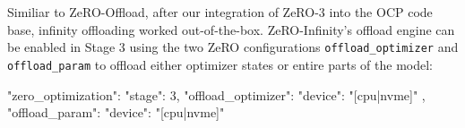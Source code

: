 Similiar to ZeRO-Offload, after our integration of ZeRO-3 into the OCP 
code base, infinity offloading worked out-of-the-box. ZeRO-Infinity's
offload engine can be enabled in Stage 3 using the two ZeRO configurations 
\texttt{offload\_optimizer} and \texttt{offload\_param} to offload 
either optimizer states or entire parts of the model:

\newpage
\begin{json}
"zero_optimization": {
    "stage": 3,
    "offload_optimizer": {
        "device": "[cpu|nvme]"
    },
    "offload_param": {
        "device": "[cpu|nvme]"
    }
}
\end{json}